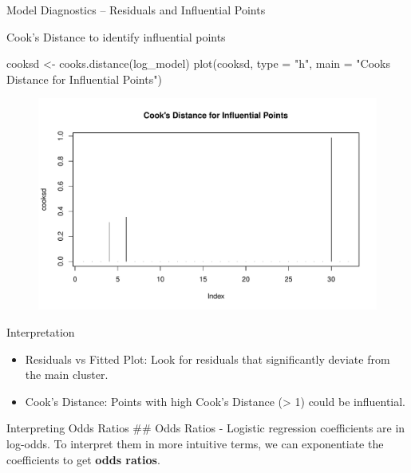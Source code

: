 \documentclass[
  18 pt,
  ignorenonframetext,
  aspectratio=1610,
]{beamer}
\newenvironment{Shaded}{\begin{snugshade}}{\end{snugshade}}
\newcommand{\AttributeTok}[1]{\textcolor[rgb]{0.40,0.45,0.13}{#1}}
\newcommand{\FunctionTok}[1]{\textcolor[rgb]{0.28,0.35,0.67}{#1}}
\newcommand{\NormalTok}[1]{\textcolor[rgb]{0.00,0.23,0.31}{#1}}
\newcommand{\OtherTok}[1]{\textcolor[rgb]{0.00,0.23,0.31}{#1}}
\newcommand{\StringTok}[1]{\textcolor[rgb]{0.13,0.47,0.30}{#1}}
\providecommand{\tightlist}{%
  \setlength{\itemsep}{0pt}\setlength{\parskip}{0pt}}\usepackage{longtable,booktabs,array}
\begin{document}
\begin{frame}[fragile]{Model Diagnostics -- Residuals and Influential
Points}
\protect\hypertarget{model-diagnostics-residuals-and-influential-points-2}{}
\begin{block}{Cook's Distance to identify influential points}
\protect\hypertarget{cooks-distance-to-identify-influential-points}{}
\tiny

\begin{Shaded}
\begin{Highlighting}[]
\NormalTok{cooksd }\OtherTok{\textless{}{-}} \FunctionTok{cooks.distance}\NormalTok{(log\_model)}
\FunctionTok{plot}\NormalTok{(cooksd, }\AttributeTok{type =} \StringTok{"h"}\NormalTok{, }\AttributeTok{main =} \StringTok{"Cook\textquotesingle{}s Distance for Influential Points"}\NormalTok{)}
\end{Highlighting}
\end{Shaded}

\begin{figure}

{\centering \includegraphics[width=\textwidth,height=0.5\textheight]{R-Regression_files/figure-beamer/unnamed-chunk-36-1.pdf}

}

\end{figure}

\tiny

\begin{block}{Interpretation}
\protect\hypertarget{interpretation-12}{}
\begin{itemize}
\tightlist
\item
  Residuals vs Fitted Plot: Look for residuals that significantly
  deviate from the main cluster.
\item
  Cook's Distance: Points with high Cook's Distance (\textgreater{} 1)
  could be influential.
\end{itemize}

Interpreting Odds Ratios \#\# Odds Ratios - Logistic regression
coefficients are in log-odds. To interpret them in more intuitive terms,
we can exponentiate the coefficients to get \textbf{odds ratios}.
\end{block}
\end{block}
\end{frame}
\end{document}
